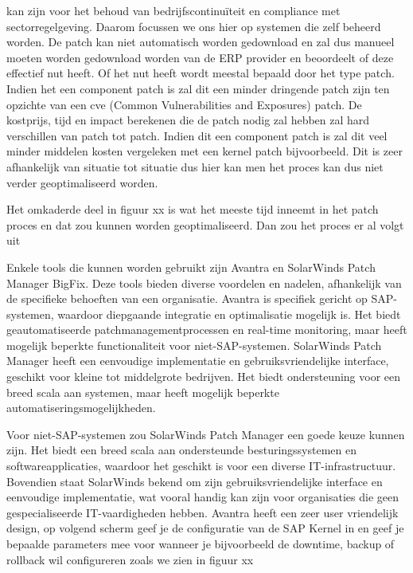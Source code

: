 \documentclass[dutch,dit,thesis]{hogentreport}
\begin{document}
kan zijn voor het behoud van bedrijfscontinuïteit en compliance met sectorregelgeving. Daarom focussen we ons hier op systemen die zelf beheerd worden. 
De patch kan niet automatisch worden gedownload en zal dus manueel moeten worden gedownload worden van de ERP provider en beoordeelt of deze effectief nut heeft. Of het nut heeft wordt
 meestal bepaald door het type patch. Indien het een component patch is zal dit een minder dringende patch zijn ten opzichte van een cve (Common Vulnerabilities and Exposures) patch. De
  kostprijs, tijd en impact berekenen die de patch nodig zal hebben zal hard verschillen van patch tot patch. Indien dit een component patch is zal dit veel minder middelen kosten vergeleken
   met een kernel patch bijvoorbeeld. Dit is zeer afhankelijk van situatie tot situatie dus hier kan men het proces kan dus niet verder geoptimaliseerd worden.


 Het omkaderde deel in figuur xx is wat het meeste tijd inneemt in het patch proces en dat zou kunnen worden geoptimaliseerd. Dan zou het proces er al volgt uit




 Enkele tools die kunnen worden gebruikt zijn Avantra en SolarWinds Patch Manager BigFix. Deze tools bieden diverse voordelen en nadelen, afhankelijk van de specifieke behoeften van een organisatie.
 Avantra is specifiek gericht op SAP-systemen, waardoor diepgaande integratie en optimalisatie mogelijk is. Het biedt geautomatiseerde patchmanagementprocessen en real-time monitoring, maar heeft 
 mogelijk beperkte functionaliteit voor niet-SAP-systemen.
 SolarWinds Patch Manager heeft een eenvoudige implementatie en gebruiksvriendelijke interface, geschikt voor kleine tot middelgrote bedrijven. Het biedt ondersteuning voor een breed scala aan 
 systemen, maar heeft mogelijk beperkte automatiseringsmogelijkheden.
 
 Voor niet-SAP-systemen zou SolarWinds Patch Manager een goede keuze kunnen zijn. Het biedt een breed scala aan ondersteunde besturingssystemen en softwareapplicaties, waardoor het geschikt is voor
  een diverse IT-infrastructuur. Bovendien staat SolarWinds bekend om zijn gebruiksvriendelijke interface en eenvoudige implementatie, wat vooral handig kan zijn voor organisaties die geen gespecialiseerde IT-vaardigheden hebben.
 Avantra heeft een zeer user vriendelijk design, op volgend scherm geef je de configuratie van de SAP Kernel in en geef je bepaalde parameters mee voor wanneer je bijvoorbeeld de downtime, backup of 
 rollback wil configureren zoals we zien in figuur xx
 
\end{document}
